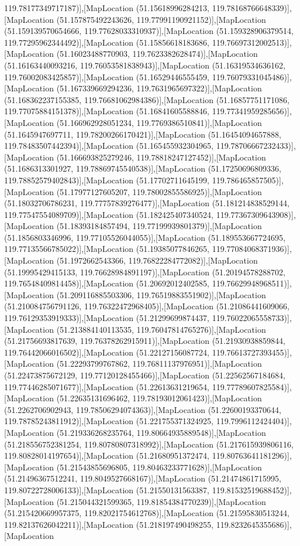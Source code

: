 119.78177349717187)],[MapLocation (51.15618996284213, 119.78168766648339)],[MapLocation (51.157875492243626, 119.77991190921152)],[MapLocation (51.159139570654666, 119.77628033310937)],[MapLocation (51.159328906379514, 119.77295962344492)],[MapLocation (51.15856618183686, 119.76697312002513)],[MapLocation (51.16023488770903, 119.7623382628474)],[MapLocation (51.16163440093216, 119.76053581838943)],[MapLocation (51.16319534636162, 119.76002083425857)],[MapLocation (51.16529446555459, 119.76079331045486)],[MapLocation (51.167339669294236, 119.7631965697322)],[MapLocation (51.168362237155385, 119.76681062984386)],[MapLocation (51.16857751171086, 119.77075884151378)],[MapLocation (51.16841605588846, 119.77341959285656)],[MapLocation (51.166962928051234, 119.7769386510841)],[MapLocation (51.1645947697711, 119.78200266170421)],[MapLocation (51.16454094657888, 119.78483507442394)],[MapLocation (51.165455932304965, 119.78706667232433)],[MapLocation (51.166693825279246, 119.78818247127452)],[MapLocation (51.1686313301927, 119.78869745540538)],[MapLocation (51.17250696809336, 119.78852579402843)],[MapLocation (51.17702711645199, 119.786465857505)],[MapLocation (51.17977127605207, 119.78002855586925)],[MapLocation (51.18032706786231, 119.77757839276477)],[MapLocation (51.181214838529144, 119.77547554089709)],[MapLocation (51.182425407340524, 119.77367309643908)],[MapLocation (51.18393184857494, 119.77199939801379)],[MapLocation (51.1856803346996, 119.77105526044055)],[MapLocation (51.189553667724695, 119.77135566785022)],[MapLocation (51.19385077846265, 119.77084068371936)],[MapLocation (51.1972662543366, 119.76822284772082)],[MapLocation (51.19995429415133, 119.76628984891197)],[MapLocation (51.20194578288702, 119.76548409814458)],[MapLocation (51.20692012402585, 119.76629948968511)],[MapLocation (51.209116885503306, 119.76519883551902)],[MapLocation (51.210084756791126, 119.76322472968405)],[MapLocation (51.21086441609066, 119.76129353919333)],[MapLocation (51.21299699874437, 119.76022065558733)],[MapLocation (51.213884140113535, 119.76047814765276)],[MapLocation (51.21756693817639, 119.76378262915911)],[MapLocation (51.21930938859844, 119.76442066016502)],[MapLocation (51.22127156087724, 119.76613727393455)],[MapLocation (51.22293799767862, 119.76811137976951)],[MapLocation (51.22473875672129, 119.77120128455466)],[MapLocation (51.22562567184684, 119.77446285071677)],[MapLocation (51.22613631219654, 119.77789607825584)],[MapLocation (51.22635131696462, 119.78193012061423)],[MapLocation (51.2262706902943, 119.78506294074363)],[MapLocation (51.22600193370644, 119.78785243811912)],[MapLocation (51.221755371324925, 119.7996112424404)],[MapLocation (51.219336268235764, 119.80664935889548)],[MapLocation (51.218556752381254, 119.80780807318992)],[MapLocation (51.217615939806116, 119.80828014197654)],[MapLocation (51.21680951372474, 119.80763641181296)],[MapLocation (51.21543855696805, 119.80463233771628)],[MapLocation (51.21496367512241, 119.8049527668167)],[MapLocation (51.21474861715995, 119.80722728006133)],[MapLocation (51.21550131563387, 119.81532519688452)],[MapLocation (51.215044321599365, 119.81854384770239)],[MapLocation (51.215420669957375, 119.82021754612768)],[MapLocation (51.21595830513244, 119.82137626042211)],[MapLocation (51.218197490498255, 119.8232645355686)],[MapLocation 